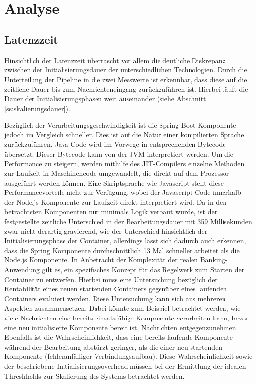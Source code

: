 \section{Analyse}


\subsection{Latenzzeit}
Hinsichtlich der Latenzzeit überrascht vor allem die deutliche Diskrepanz zwischen der Initialisierungsdauer der unterschiedlichen Technologien. Durch die Unterteilung der Pipeline in die zwei Messwerte ist erkennbar, dass diese auf die zeitliche Dauer bis zum Nachrichteneingang zurückzuführen ist. Hierbei läuft die Dauer der Initialisierungsphasen weit auseinander (siehe Abschnitt \ref{ss:skalierungsdauer}).

Bezüglich der Verarbeitungsgeschwindigkeit ist die Spring-Boot-Komponente jedoch im Vergleich schneller. Dies ist auf die Natur einer kompilierten Sprache zurückzuführen. Java Code wird im Vorwege in entsprechenden Bytecode übersetzt. Dieser Bytecode kann von der JVM interpretiert werden. Um die Performance zu steigern, werden mithilfe des JIT-Compilers einzelne Methoden zur Laufzeit in Maschinencode umgewandelt, die direkt auf dem Prozessor ausgeführt werden können. Eine Skriptsprache wie Javascript stellt diese Performancevorteile nicht zur Verfügung, wobei der Javascript-Code innerhalb der Node.js-Komponente zur Laufzeit direkt interpretiert wird. Da in den betrachteten Komponenten nur minimale Logik verbaut wurde, ist der festgestellte zeitliche Unterschied in der Bearbeitungsdauer mit 359  Millisekunden zwar nicht derartig gravierend, wie der Unterschied hinsichtlich der Initialisierungsphase der Container, allerdings lässt sich dadurch auch erkennen, dass die Spring Komponente durchschnittlich 13 Mal schneller arbeitet als die Node.js Komponente. In Anbetracht der Komplexität der realen Banking-Anwendung gilt es, ein spezifisches Konzept für das Regelwerk zum Starten der Container zu entwerfen. Hierbei muss eine Untersuchung bezüglich der Rentabilität eines neuen startenden Containers gegenüber eines laufenden Containers evaluiert werden. Diese Untersuchung kann sich aus mehreren Aspekten zusammensetzen. Dabei könnte zum Beispiel betrachtet werden, wie viele Nachrichten eine bereits einsatzfähige Komponente verarbeiten kann, bevor eine neu initialisierte Komponente bereit ist, Nachrichten entgegenzunehmen. Ebenfalls ist die Wahrscheinlichkeit, dass eine bereits laufende Komponente während der Bearbeitung abstürzt geringer, als die einer neu startenden Komponente (fehleranfälliger Verbindungsaufbau). Diese Wahrscheinlichkeit sowie der beschriebene Initialisierungsoverhead müssen bei der Ermittlung der idealen Threshholds zur Skalierung des Systems betrachtet werden.

